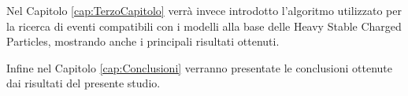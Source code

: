 Nel Capitolo \ref{cap:TerzoCapitolo} verrà invece introdotto l'algoritmo utilizzato per la ricerca di eventi compatibili con i modelli alla base delle Heavy Stable Charged Particles, mostrando anche i principali risultati ottenuti.

Infine nel Capitolo \ref{cap:Conclusioni} verranno presentate le conclusioni ottenute dai risultati del presente studio. 

